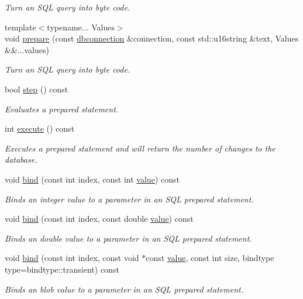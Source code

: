 \begin{DoxyCompactItemize}
\begin{DoxyCompactList}\small\item\em Turn an S\-Q\-L query into byte code. \end{DoxyCompactList}\item 
{\footnotesize template$<$typename... Values$>$ }\\void \hyperlink{a00013_abb6b5ec78b6ed682f11667f5a611818c}{prepare} (const \hyperlink{a00004}{dbconnection} \&connection, const std\-::u16string \&text, Values \&\&...values)
\begin{DoxyCompactList}\small\item\em Turn an S\-Q\-L query into byte code. \end{DoxyCompactList}\item 
bool \hyperlink{a00013_ad1039653cca9f00708ce570011791b9d}{step} () const 
\begin{DoxyCompactList}\small\item\em Evaluates a prepared statement. \end{DoxyCompactList}\item 
int \hyperlink{a00013_a7a01f06c30b4f751d65f0f14fae3277a}{execute} () const 
\begin{DoxyCompactList}\small\item\em Executes a prepared statement and will return the number of changes to the database. \end{DoxyCompactList}\item 
void \hyperlink{a00013_a91d16077f086fe6becb4c7bae576b0e7}{bind} (const int index, const int \hyperlink{a00015}{value}) const 
\begin{DoxyCompactList}\small\item\em Binds an integer value to a parameter in an S\-Q\-L prepared statement. \end{DoxyCompactList}\item 
void \hyperlink{a00013_a80f067e9b5bc981210593d3aac067cc5}{bind} (const int index, const double \hyperlink{a00015}{value}) const 
\begin{DoxyCompactList}\small\item\em Binds an double value to a parameter in an S\-Q\-L prepared statement. \end{DoxyCompactList}\item 
void \hyperlink{a00013_ae6eda84becdf90c4e0a0bb25601dc54d}{bind} (const int index, const void $\ast$const \hyperlink{a00015}{value}, const int size, bindtype type=bindtype\-::transient) const 
\begin{DoxyCompactList}\small\item\em Binds an blob value to a parameter in an S\-Q\-L prepared statement. \end{DoxyCompactList}\item 

\end{DoxyCompactItemize}
